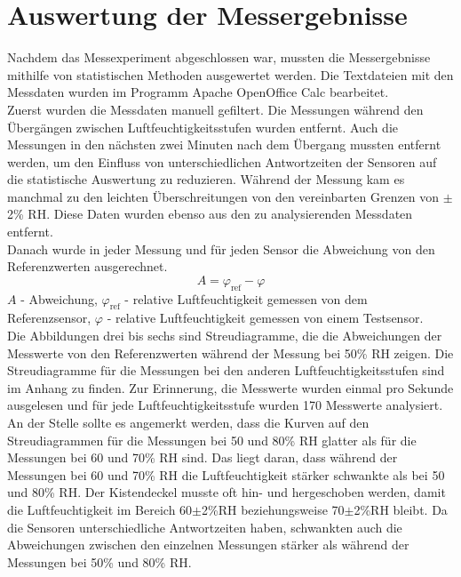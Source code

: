 \documentclass[runningheads]{llncs}
\begin{document}
\section{Auswertung der Messergebnisse}
Nachdem das Messexperiment abgeschlossen war, mussten die Messergebnisse mithilfe von statistischen Methoden ausgewertet werden. Die Textdateien mit den Messdaten wurden im Programm Apache OpenOffice Calc bearbeitet.
\\Zuerst wurden die Messdaten manuell gefiltert. Die Messungen während den Übergängen zwischen Luftfeuchtigkeitsstufen wurden entfernt. Auch die Messungen in den nächsten zwei Minuten nach dem Übergang mussten entfernt werden, um den Einfluss von unterschiedlichen Antwortzeiten der Sensoren auf die statistische Auswertung zu reduzieren. Während der Messung kam es manchmal zu den leichten Überschreitungen von den vereinbarten Grenzen von $\pm$2\% RH. Diese Daten wurden ebenso aus den zu analysierenden Messdaten entfernt.
\\Danach wurde in jeder Messung und für jeden Sensor die Abweichung von den Referenzwerten ausgerechnet.
\begin{equation}
A=\varphi_{\text{ref}} - \varphi
\label{formel1}
\end{equation}
$A$ - Abweichung, $\varphi_{\text{ref}}$ - relative Luftfeuchtigkeit gemessen von dem Referenzsensor, $\varphi$ - relative Luftfeuchtigkeit gemessen von einem Testsensor.
\\Die Abbildungen drei bis sechs sind Streudiagramme, die die Abweichungen der Messwerte von den Referenzwerten während der Messung bei 50\% RH zeigen. Die Streudiagramme für die Messungen bei den anderen Luftfeuchtigkeitsstufen sind im Anhang zu finden. Zur Erinnerung, die Messwerte wurden einmal pro Sekunde ausgelesen und für jede Luftfeuchtigkeitsstufe wurden 170 Messwerte analysiert. An der Stelle sollte es angemerkt werden, dass die Kurven auf den Streudiagrammen für die Messungen bei 50 und 80\% RH glatter als für die Messungen bei 60 und 70\% RH sind. Das liegt daran, dass während der Messungen bei 60 und 70\% RH die Luftfeuchtigkeit stärker schwankte als bei 50 und 80\% RH. Der Kistendeckel musste oft hin- und hergeschoben werden, damit die Luftfeuchtigkeit im Bereich 60$\pm$2\%RH beziehungsweise 70$\pm$2\%RH bleibt. Da die Sensoren unterschiedliche Antwortzeiten haben, schwankten auch die Abweichungen zwischen den einzelnen Messungen stärker als während der Messungen bei 50\% und 80\% RH. 
\end{document}
